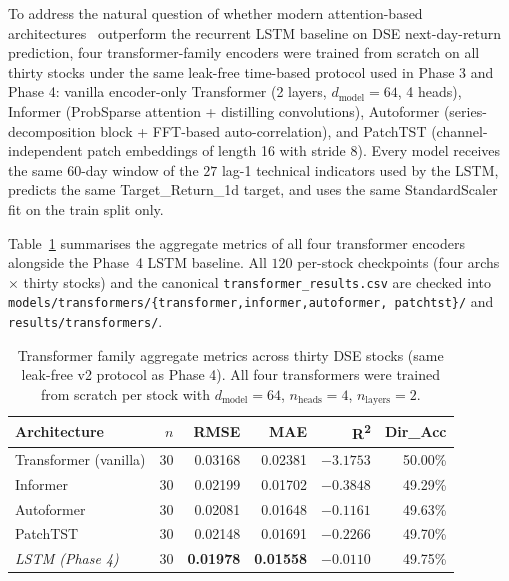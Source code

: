 \documentclass[12pt,a4paper,oneside]{report}
\begin{document}
To address the natural question of whether modern attention-based
architectures~\cite{vaswani2017attention,zhou2021informer,
wu2021autoformer,nie2023patchtst} outperform the recurrent
\ac{LSTM} baseline on DSE next-day-return prediction, four
transformer-family encoders were trained from scratch on all
thirty stocks under the same leak-free time-based protocol used
in Phase 3 and Phase 4:
vanilla encoder-only Transformer (2 layers, $d_{\text{model}}=64$,
4 heads), Informer (ProbSparse attention + distilling convolutions),
Autoformer (series-decomposition block + FFT-based auto-correlation),
and PatchTST (channel-independent patch embeddings of length 16 with
stride 8). Every model receives the same $60$-day window of the
$27$ lag-1 technical indicators used by the \ac{LSTM}, predicts
the same Target\_Return\_1d target, and uses the same
StandardScaler fit on the train split only.

Table~\ref{tab:phase5} summarises the aggregate metrics of all
four transformer encoders alongside the Phase~4 \ac{LSTM}
baseline. All $120$ per-stock checkpoints (four archs
$\times$ thirty stocks) and the canonical
\texttt{transformer\_results.csv} are checked into
\texttt{models/transformers/\{transformer,informer,autoformer,
patchtst\}/} and \texttt{results/transformers/}.

\begin{table}[H]
  \centering
  \caption{Transformer family aggregate metrics across thirty DSE
  stocks (same leak-free v2 protocol as Phase 4). All four
  transformers were trained from scratch per stock with
  $d_{\text{model}}=64$, $n_{\text{heads}}=4$, $n_{\text{layers}}=2$.}
  \label{tab:phase5}
  \begin{tabular}{lrrrrr}
    \toprule
    Architecture & $n$ & \ac{RMSE} & \ac{MAE} & R\textsuperscript{2} & Dir\_Acc \\
    \midrule
    Transformer (vanilla) & 30 & 0.03168 & 0.02381 & $-3.1753$ & 50.00\% \\
    Informer              & 30 & 0.02199 & 0.01702 & $-0.3848$ & 49.29\% \\
    Autoformer            & 30 & 0.02081 & 0.01648 & $-0.1161$ & 49.63\% \\
    PatchTST              & 30 & 0.02148 & 0.01691 & $-0.2266$ & 49.70\% \\
    \midrule
    \emph{LSTM (Phase 4)} & 30 & \textbf{0.01978} & \textbf{0.01558} & $-0.0110$ & 49.75\% \\
    \bottomrule
  \end{tabular}
\end{table}
\end{document}
